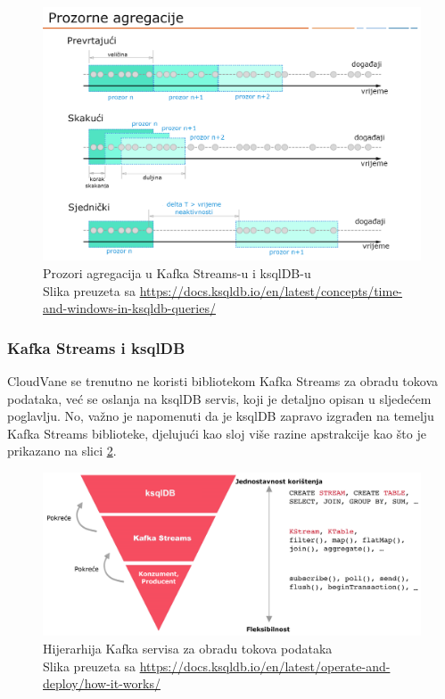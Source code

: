 \documentclass[times, utf8, diplomski]{fer}
\begin{document}
\begin{figure}[htb]
	\centering
	\includegraphics[width=15cm]{images/Windows.png}
	\caption[Prozori agregacija u Kafka Streams-u i ksqlDB-u]{Prozori agregacija u Kafka Streams-u i ksqlDB-u\\Slika preuzeta sa \url{https://docs.ksqldb.io/en/latest/concepts/time-and-windows-in-ksqldb-queries/}}
	\label{fig:windows}
\end{figure}

\subsubsection{Kafka Streams i ksqlDB}

CloudVane se trenutno ne koristi bibliotekom Kafka Streams za obradu tokova podataka, već se oslanja na ksqlDB servis, koji je detaljno opisan u sljedećem poglavlju. No, važno je napomenuti da je ksqlDB zapravo izgrađen na temelju Kafka Streams biblioteke, djelujući kao sloj više razine apstrakcije kao što je prikazano na slici \ref{fig:ksqldb_streams}.

\begin{figure}[htb]
	\centering
	\includegraphics[width=13cm]{images/ksql_streams_consumer.png}
	\caption[Hijerarhija Kafka servisa za obradu tokova podataka]{Hijerarhija Kafka servisa za obradu tokova podataka\\Slika preuzeta sa \url{https://docs.ksqldb.io/en/latest/operate-and-deploy/how-it-works/}}
	\label{fig:ksqldb_streams}
\end{figure}
\end{document}
